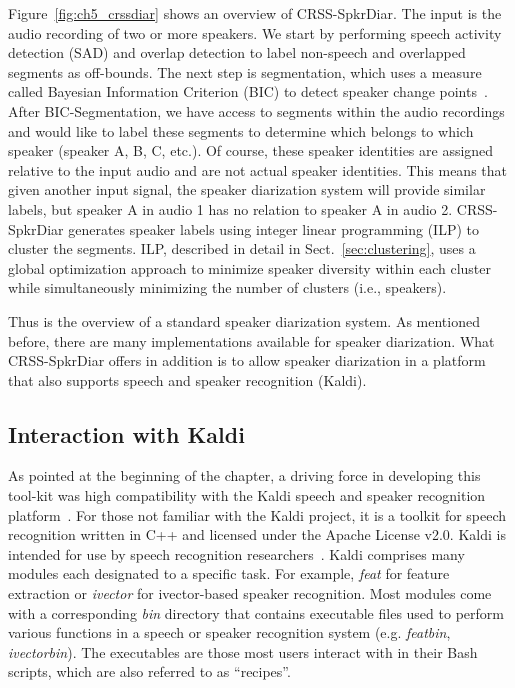 Figure~\ref{fig:ch5_crssdiar} shows an overview of CRSS-SpkrDiar. 
The input is the audio recording of two or more speakers. 
We start by performing speech activity detection (SAD) and overlap detection to label non-speech and overlapped segments as off-bounds. 
The next step is segmentation, which uses a measure called Bayesian Information Criterion (BIC) to detect speaker change points~\cite{chen1998BIC,zhou2005T2bic}. 
After BIC-Segmentation, we have access to segments within the audio recordings and would like to label these segments to determine which belongs to which speaker (speaker A, B, C, etc.). 
Of course, these speaker identities are assigned relative to the input audio and are not actual speaker identities. 
This means that given another input signal, the speaker diarization system will provide similar labels, but speaker A in audio 1 has no relation to speaker A in audio 2. 
CRSS-SpkrDiar generates speaker labels using integer linear programming (ILP) to cluster the segments. 
ILP, described in detail in Sect.~\ref{sec:clustering}, uses a global optimization approach to minimize speaker diversity within each cluster while simultaneously minimizing the number of clusters (i.e., speakers). 

Thus is the overview of a standard speaker diarization system. 
As mentioned before, there are many implementations available for speaker diarization. 
What CRSS-SpkrDiar offers in addition is to allow speaker diarization in a platform that also supports speech and speaker recognition (Kaldi). 


\subsection{Interaction with Kaldi}
\label{ssec:crssdiar_and_kaldi}

As pointed at the beginning of the chapter, a driving force in developing this tool-kit was high compatibility with the Kaldi speech and speaker recognition platform~\cite{kaldi}. 
For those not familiar with the Kaldi project, it is a toolkit for speech recognition written in C++ and licensed under the Apache License v2.0. Kaldi is intended for use by speech recognition researchers~\cite{kaldi}. 
Kaldi comprises many modules each designated to a specific task. For example, {\it feat} for feature extraction or {\it ivector} for ivector-based speaker recognition. 
Most modules come with a corresponding {\it bin} directory  that contains executable files used to perform various functions in a speech or speaker recognition system (e.g. {\it featbin}, {\it ivectorbin}). 
The executables are those most users interact with in their Bash scripts, which are also referred to as ``recipes''. 

